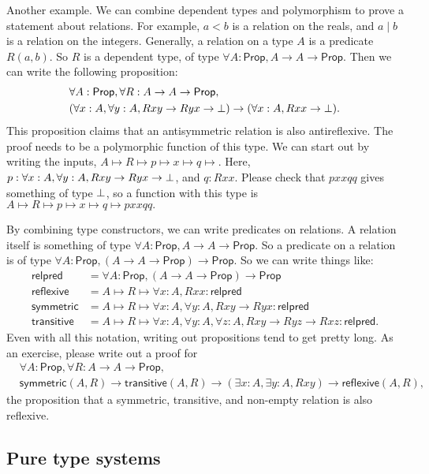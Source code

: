 \documentclass[11pt,paper=letter]{scrartcl}
\renewcommand{\sf}{\mathsf}
\newcommand{\prop}{\mathsf{Prop}}
\begin{document}
Another example. We can combine dependent types and polymorphism to prove a statement about relations. For example, $a < b$ is a relation on the reals, and $a \mid b$ is a relation on the integers. Generally, a relation on a type $A$ is a predicate $R(a, b)$. So $R$ is a dependent type, of type $\forall A: \prop, A \to A \to \prop$. Then we can write the following proposition:
\begin{align*}
&\forall A: \prop, \forall R: A \to A \to \prop,\\
&(\forall x: A, \forall y: A, Rxy \to Ryx \to \false) \to (\forall x: A, Rxx \to \false).
\end{align*}
This proposition claims that an antisymmetric relation is also antireflexive. The proof needs to be a polymorphic function of this type. We can start out by writing the inputs, $A \mapsto R \mapsto p \mapsto x \mapsto q \mapsto$. Here, $p : \forall x: A, \forall y: A, Rxy \to Ryx \to \bot$, and $q: Rxx$. Please check that $pxxqq$ gives something of type $\bot$, so a function with this type is $A \mapsto R \mapsto p \mapsto x \mapsto q \mapsto pxxqq.$

By combining type constructors, we can write predicates on relations. A relation itself is something of type $\forall A: \prop, A \to A \to \prop$. So a predicate on a relation is of type $\forall A: \prop, (A \to A \to \prop) \to \prop$. So we can write things like:
\begin{align*}
\sf{relpred} &= \forall A: \prop, (A \to A \to \prop) \to \prop \\
\sf{reflexive} &= A \mapsto R \mapsto \forall x: A, Rxx: \sf{relpred} \\
\sf{symmetric} &= A \mapsto R \mapsto \forall x: A, \forall y: A, Rxy \to Ryx: \sf{relpred} \\
\sf{transitive} &= A \mapsto R \mapsto \forall x: A, \forall y: A, \forall z: A, Rxy \to Ryz \to Rxz: \sf{relpred}.
\end{align*}
Even with all this notation, writing out propositions tend to get pretty long. As an exercise, please write out a proof for
\begin{align*}
&\forall A: \prop, \forall R: A \to A \to \prop,\\
&\sf{symmetric}(A, R) \to \sf{transitive}(A, R) \to (\exists x: A, \exists y: A, Rxy) \to \sf{reflexive}(A, R),
\end{align*}
the proposition that a symmetric, transitive, and non-empty relation is also reflexive.

\subsection{Pure type systems}
\end{document}
